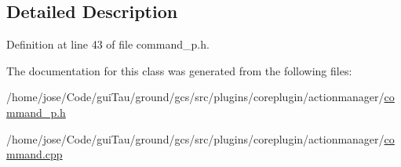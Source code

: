 \subsection{Detailed Description}


Definition at line 43 of file command\-\_\-p.\-h.



The documentation for this class was generated from the following files\-:\begin{DoxyCompactItemize}
\item 
/home/jose/\-Code/gui\-Tau/ground/gcs/src/plugins/coreplugin/actionmanager/\hyperlink{command__p_8h}{command\-\_\-p.\-h}\item 
/home/jose/\-Code/gui\-Tau/ground/gcs/src/plugins/coreplugin/actionmanager/\hyperlink{command_8cpp}{command.\-cpp}\end{DoxyCompactItemize}

